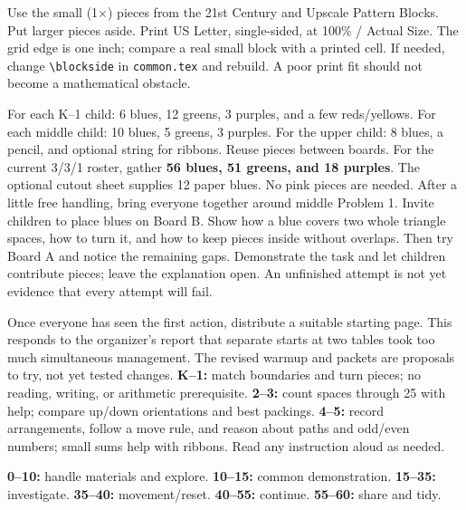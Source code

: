 \documentclass[11pt]{article}
\begin{document}
Use the small (1\(\times\)) pieces from the 21st Century and Upscale Pattern Blocks. Put larger pieces aside. Print US Letter, single-sided, at 100\% / Actual Size. The grid edge is one inch; compare a real small block with a printed cell. If needed, change \texttt{\textbackslash blockside} in \texttt{common.tex} and rebuild. A poor print fit should not become a mathematical obstacle.

For each K--1 child: 6 blues, 12 greens, 3 purples, and a few reds/yellows. For each middle child: 10 blues, 5 greens, 3 purples. For the upper child: 8 blues, a pencil, and optional string for ribbons. Reuse pieces between boards. For the current 3/3/1 roster, gather \textbf{56 blues, 51 greens, and 18 purples}. The optional cutout sheet supplies 12 paper blues. No pink pieces are needed.
After a little free handling, bring everyone together around middle Problem 1. Invite children to place blues on Board B. Show how a blue covers two whole triangle spaces, how to turn it, and how to keep pieces inside without overlaps. Then try Board A and notice the remaining gaps. Demonstrate the task and let children contribute pieces; leave the explanation open. An unfinished attempt is not yet evidence that every attempt will fail.

Once everyone has seen the first action, distribute a suitable starting page. This responds to the organizer's report that separate starts at two tables took too much simultaneous management. The revised warmup and packets are proposals to try, not yet tested changes.
\textbf{K--1:} match boundaries and turn pieces; no reading, writing, or arithmetic prerequisite. \textbf{2--3:} count spaces through 25 with help; compare up/down orientations and best packings. \textbf{4--5:} record arrangements, follow a move rule, and reason about paths and odd/even numbers; small sums help with ribbons. Read any instruction aloud as needed.

\textbf{0--10:} handle materials and explore. \textbf{10--15:} common demonstration. \textbf{15--35:} investigate. \textbf{35--40:} movement/reset. \textbf{40--55:} continue. \textbf{55--60:} share and tidy.
\end{document}
